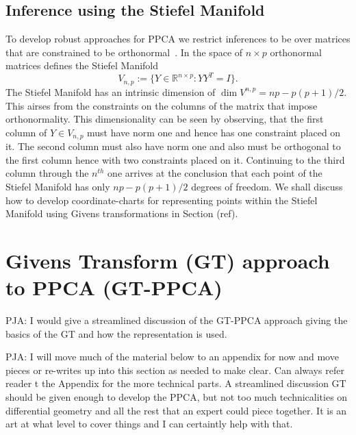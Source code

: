 \documentclass{article}
\newcommand{\commentPJA}[1]{{\textcolor{commentPJA_color}{PJA: #1}}}
\begin{document}
\subsection{Inference using the Stiefel Manifold}
To develop robust approaches for PPCA we restrict inferences to be over matrices that are constrained to be orthonormal~\citet[chapt.~12.1.3]{murphy2012machine}.  In the space of $n\times p$ orthonormal matrices defines the Stiefel Manifold~\citep{muirhead2009aspects}
\begin{equation}
V_{n,p} := \{Y \in \mathbb{R}^{n \times p}: YY^T = I \}.
\end{equation}
The Stiefel Manifold has an intrinsic dimension of $\dim{V^{n,p}} = np-p(p+1)/2$.  This airses from the constraints on the columns of the matrix that impose orthonormality.  This dimensionality can be seen by observing, that the first column of $Y \in V_{n,p}$ must have norm one and hence has one constraint placed on it. The second column must also have norm one and also must be orthogonal to the first column hence with two constraints placed on it.  Continuing to the third column through the $n^{th}$ one arrives at the conclusion that each point of the Stiefel Manifold has only $np-p(p+1)/2$ degrees of freedom.  We shall discuss how to develop coordinate-charts for  representing points within the Stiefel Manifold using Givens transformations in Section (ref).


\section{Givens Transform (GT) approach to PPCA (GT-PPCA)} \label{Givens}

\commentPJA{I would give a streamlined discussion of the GT-PPCA approach giving the basics of the GT and how the representation is used.}


\commentPJA{I will move much of the material below to an appendix for now and move pieces or re-writes up into this section as needed to make clear.  Can always refer reader t the Appendix for the more technical parts.  A streamlined discussion GT should be given enough to develop the PPCA, but not too much technicalities on differential geometry and all the rest that an expert could piece together.  It is an art at what level to cover things and I can certaintly help with that.  }
\end{document}
